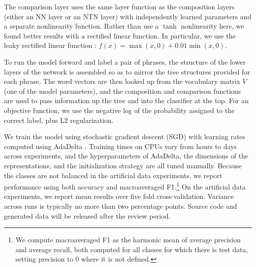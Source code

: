 The comparison layer uses the same layer function as the
composition layers (either an NN layer or an NTN layer) with
independently learned parameters and a separate nonlinearity function.
Rather than use a $\tanh$ nonlinearity here, we found better results with a rectified linear function. In
particular, we use the leaky rectified linear function
\cite{maasrectifier}: $f(x)=\max(x, 0) +
0.01\min(x, 0)$.

To run the model forward and label a pair of phrases, the structure of
the lower layers of the network is assembled so as to mirror the tree
structures provided for each phrase. The word vectors are then looked
up from the vocabulary matrix $V$ (one of the model parameters), and
the composition and comparison functions are used to pass information
up the tree and into the classifier at the top. For an objective
function, we use the negative log of the probability assigned to the
correct label, plus L2 regularization.

We train the model using stochastic gradient descent (SGD)
with learning rates computed using AdaDelta \cite{zeiler2012adadelta}.
Training times on CPUs vary from hours to days across experiments, and
the hyperparameters of AdaDelta, the dimensions of the representations,
and the initialization strategy are all tuned manually.
Because the classes are not balanced in the artificial data experiments, we report performance
using both accuracy and macroaveraged F1.\footnote{We compute macroaveraged F1 
as the harmonic mean of average precision and average recall, both computed
for all classes for which there is test data, setting precision to 0 
where it is not defined.} On the artificial data experiments, we report mean
results over five fold cross-validation. Variance across runs is typically no
more than two percentage points.
Source code and generated data will be released after the review period.

